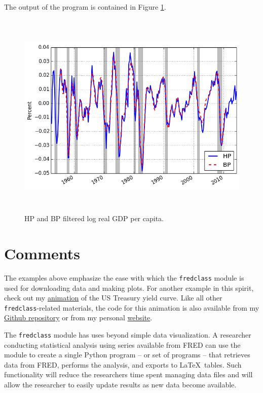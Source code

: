 \documentclass[11pt,fleqn]{article}
\newcommand{\ttt}{\texttt}
\begin{document}
\noindent The output of the program is contained in Figure \ref{fig:3}.

\begin{figure}[h] \caption{\label{fig:3} HP and BP filtered log real GDP per capita.}
\begin{center}
\includegraphics[height = 10cm]{fig_fredclass_example3.png}
\end{center}
\end{figure}


\section{Comments}

The examples above emphasize the ease with which the \ttt{fredclass} module is used for downloading data and making plots. For another example in this spirit, check out my \href{http://youtu.be/34bIQGrndao}{animation} of the US Treasury yield curve. Like all other \ttt{fredclass}-related materials, the code for this animation is also available from my \href{https://github.com/letsgoexploring/fredclass}{Github repository} or from my personal \href{http://www.briancjenkins.com/code/fredclass.html}{website}.

The \ttt{fredclass} module has uses beyond simple data visualization. A researcher conducting statistical analysis using series available from FRED can use the module to create a single Python program -- or set of programs -- that retrieves data from FRED, performs the analysis, and exports to \LaTeX \ tables. Such functionality will reduce the researchers time spent managing data files and will allow the researcher to easily update results as new data become available.
\end{document}
